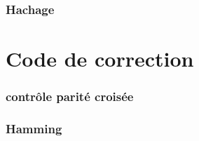 \documentclass[a4paper,10pt]{report}
\begin{document}
        \section{Hachage}

    \part{Code de correction}
        \section[LRC]{contrôle parité croisée}

        \section{Hamming}
\end{document}
